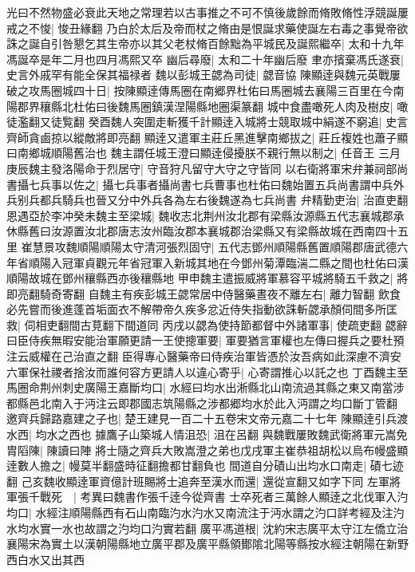 光曰不然物盛必衰此天地之常理若以古事推之不可不慎後歲餘而脩敗脩性浮競誕屢戒之不悛|{
	悛丑緣翻}
乃白於太后及帝而杖之脩由是恨誕求藥使誕左右毒之事覺帝欲誅之誕自引咎懇乞其生帝亦以其父老杖脩百餘黜為平城民及誕熙繼卒|{
	太和十九年馮誕卒是年二月也四月馮熙又卒}
幽后尋廢|{
	太和二十年幽后廢}
聿亦擯棄馮氏遂衰|{
	史言外戚罕有能全保其福禄者}
魏以彭城王勰為司徒|{
	勰音協}
陳顯逹與魏元英戰屢破之攻馬圈城四十日|{
	按陳顯逹傳馬圈在南郷界杜佑曰馬圈城去襄陽三百里在今南陽郡界穰縣北杜佑曰後魏馬圈鎮漢涅陽縣地圈渠篆翻}
城中食盡噉死人肉及樹皮|{
	噉徒濫翻又徒覧翻}
癸酉魏人突圍走斬獲千計顯逹入城將士競取城中絹遂不窮追|{
	史言齊師貪鹵掠以縱敵將即亮翻}
顯逹又遣軍主莊丘黑進擊南鄉拔之|{
	莊丘複姓也蕭子顯曰南鄉城順陽舊治也}
魏主謂任城王澄曰顯逹侵擾朕不親行無以制之|{
	任音王}
三月庚辰魏主發洛陽命于烈居守|{
	守音狩凡留守大守之守皆同}
以右衛將軍宋弁兼祠部尚書攝七兵事以佐之|{
	攝七兵事者攝尚書七兵曹事也杜佑曰魏始置五兵尚書謂中兵外兵别兵都兵騎兵也晉又分中外兵各為左右後魏遂為七兵尚書}
弁精勤吏治|{
	治直吏翻}
恩遇亞於李冲癸未魏主至梁城|{
	魏收志北荆州汝北郡有梁縣汝源縣五代志襄城郡承休縣舊曰汝源置汝北郡唐志汝州臨汝郡本襄城郡治梁縣又有梁縣故城在西南四十五里}
崔慧景攻魏順陽順陽太守清河張烈固守|{
	五代志鄧州順陽縣舊置順陽郡唐武德六年省順陽入冠軍貞觀元年省冠軍入新城其地在今鄧州菊潭臨湍二縣之間也杜佑曰漢順陽故城在鄧州穰縣西亦後穰縣地}
甲申魏主遣振威將軍慕容平城將騎五千救之|{
	將即亮翻騎奇寄翻}
自魏主有疾彭城王勰常居中侍醫藥晝夜不離左右|{
	離力智翻}
飲食必先嘗而後進蓬首垢面衣不解帶帝久疾多忿近侍失指動欲誅斬勰承顏伺間多所匡救|{
	伺相吏翻間古莧翻下間道同}
丙戌以勰為使持節都督中外諸軍事|{
	使疏吏翻}
勰辭曰臣侍疾無暇安能治軍願更請一王使摠軍要|{
	軍要猶言軍權也左傳曰握兵之要杜預注云威權在己治直之翻}
臣得專心醫藥帝曰侍疾治軍皆憑於汝吾病如此深慮不濟安六軍保社禝者捨汝而誰何容方更請人以違心寄乎|{
	心寄謂推心以託之也}
丁酉魏主至馬圈命荆州刺史廣陽王嘉斷均口|{
	水經曰均水出淅縣北山南流過其縣之東又南當涉都縣邑北南入于沔注云即郡國志筑陽縣之涉都郷均水於此入沔謂之均口斷丁管翻}
邀齊兵歸路嘉建之子也|{
	楚王建見一百二十五卷宋文帝元嘉二十七年}
陳顯逹引兵渡水西|{
	均水之西也}
據鷹子山築城人情沮恐|{
	沮在呂翻}
與魏戰屢敗魏武衛將軍元嵩免胄䧟陳|{
	陳讀曰陣}
將士隨之齊兵大敗嵩澄之弟也戊戌軍主崔恭祖胡松以烏布幔盛顯逹數人擔之|{
	幔莫半翻盛時征翻擔都甘翻負也}
間道自分磧山出均水口南走|{
	磧七迹翻}
己亥魏收顯逹軍資億計班賜將士追奔至漢水而還|{
	還從宣翻又如字下同}
左軍將軍張千戰死　|{
	考異曰魏書作張千逹今從齊書}
士卒死者三萬餘人顯逹之北伐軍入汋均口|{
	水經注順陽縣西有石山南臨汋水汋水又南流注于沔水謂之汋口詳考經及注汋水均水實一水也故謂之汋均口汋實若翻}
廣平馮道根|{
	沈約宋志廣平太守江左僑立治襄陽宋為實土以漢朝陽縣地立廣平郡及廣平縣領鄼隂北陽等縣按水經注朝陽在新野西白水又出其西}
